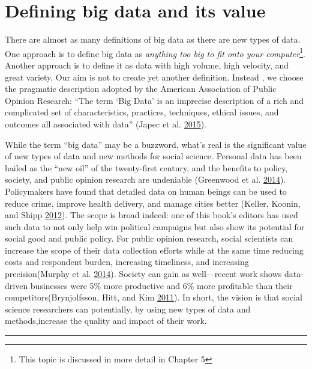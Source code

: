 \documentclass[]{krantz}
\begin{document}
\section{Defining big data and its value}\label{sec:1-2}

There are almost as many definitions of big data as there are new types
of data. One approach is to define big data as \emph{anything too big to
fit onto your computer}\footnote{This topic is discussed in more detail
  in Chapter 5}. Another approach is to define it as data with high
volume, high velocity, and great variety. Our aim is not to create yet
another definition. Instead , we choose the pragmatic description
adopted by the American Association of Public Opinion Research: ``The
term `Big Data' is an imprecise description of a rich and complicated
set of characteristics, practices, techniques, ethical issues, and
outcomes all associated with data'' (Japec et al.
\protect\hyperlink{ref-japec2015big}{2015}).

While the term ``big data'' may be a buzzword, what's real is the
significant value of new types of data and new methods for social
science. Personal data has been hailed as the ``new oil'' of the
twenty-first century, and the benefits to policy, society, and public
opinion research are undeniable (Greenwood et al.
\protect\hyperlink{ref-greenwood2014}{2014}). Policymakers have found
that detailed data on human beings can be used to reduce crime, improve
health delivery, and manage cities better (Keller, Koonin, and Shipp
\protect\hyperlink{ref-keller2012big}{2012}). The scope is broad indeed:
one of this book's editors has used such data to not only help win
political campaigns but also show its potential for social good and
public policy. For public opinion research, social scientists can
increase the scope of their data collection efforts while at the same
time reducing costs and respondent burden, increasing timeliness, and
increasing precision(Murphy et al.
\protect\hyperlink{ref-murphy2014social}{2014}). Society can gain as
well---recent work shows data-driven businesses were 5\% more productive
and 6\% more profitable than their competitors(Brynjolfsson, Hitt, and
Kim \protect\hyperlink{ref-brynjolfsson2011strength}{2011}). In short,
the vision is that social science researchers can potentially, by using
new types of data and methods,increase the quality and impact of their
work.

\begin{center}\rule{0.5\linewidth}{\linethickness}\end{center}
\end{document}
